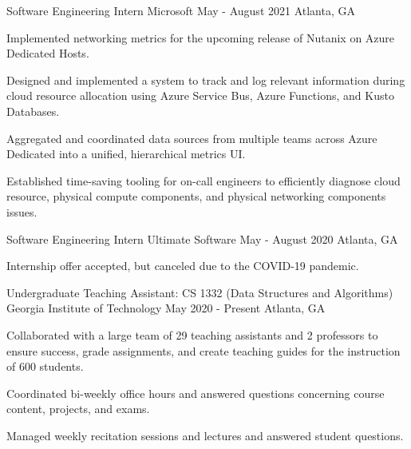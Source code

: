 

\begin{cventries}

\cventry
{Software Engineering Intern}
{Microsoft}
{May - August 2021}
{Atlanta, GA}
{
\begin{cvitems}
    \item Implemented networking metrics for the upcoming release of Nutanix on Azure Dedicated Hosts.
    \item Designed and implemented a system to track and log relevant information during cloud resource allocation
    using Azure Service Bus, Azure Functions, and Kusto Databases.
    \item Aggregated and coordinated data sources from multiple teams across Azure Dedicated
    into a unified, hierarchical metrics UI.
    \item Established time-saving tooling for on-call engineers to efficiently diagnose cloud resource,
    physical compute components, and physical networking components issues.
\end{cvitems}
}

\cventry
{Software Engineering Intern}
{Ultimate Software}
{May - August 2020}
{Atlanta, GA}
{
\begin{cvitems}
    \item Internship offer accepted, but canceled due to the COVID-19 pandemic.
\end{cvitems}
}

\cventry
{Undergraduate Teaching Assistant: CS 1332 (Data Structures and Algorithms)} %
{Georgia Institute of Technology} %
{May 2020 - Present} %
{Atlanta, GA} %
{ %
\begin{cvitems}
    \item Collaborated with a large team of 29 teaching assistants and 2 professors
    to ensure success, grade assignments, and create teaching guides
    for the instruction of 600 students.
    \item Coordinated bi-weekly office hours and answered
    questions concerning course content, projects, and exams.
    \item Managed weekly recitation sessions and lectures and answered student questions.
\end{cvitems}
}



\end{cventries}

